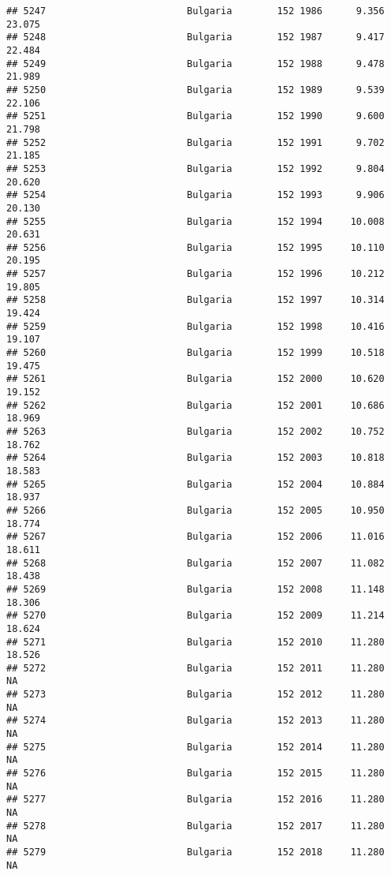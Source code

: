 \documentclass[
]{article}
\begin{document}
\begin{verbatim}
## 5247                         Bulgaria        152 1986      9.356     23.075
## 5248                         Bulgaria        152 1987      9.417     22.484
## 5249                         Bulgaria        152 1988      9.478     21.989
## 5250                         Bulgaria        152 1989      9.539     22.106
## 5251                         Bulgaria        152 1990      9.600     21.798
## 5252                         Bulgaria        152 1991      9.702     21.185
## 5253                         Bulgaria        152 1992      9.804     20.620
## 5254                         Bulgaria        152 1993      9.906     20.130
## 5255                         Bulgaria        152 1994     10.008     20.631
## 5256                         Bulgaria        152 1995     10.110     20.195
## 5257                         Bulgaria        152 1996     10.212     19.805
## 5258                         Bulgaria        152 1997     10.314     19.424
## 5259                         Bulgaria        152 1998     10.416     19.107
## 5260                         Bulgaria        152 1999     10.518     19.475
## 5261                         Bulgaria        152 2000     10.620     19.152
## 5262                         Bulgaria        152 2001     10.686     18.969
## 5263                         Bulgaria        152 2002     10.752     18.762
## 5264                         Bulgaria        152 2003     10.818     18.583
## 5265                         Bulgaria        152 2004     10.884     18.937
## 5266                         Bulgaria        152 2005     10.950     18.774
## 5267                         Bulgaria        152 2006     11.016     18.611
## 5268                         Bulgaria        152 2007     11.082     18.438
## 5269                         Bulgaria        152 2008     11.148     18.306
## 5270                         Bulgaria        152 2009     11.214     18.624
## 5271                         Bulgaria        152 2010     11.280     18.526
## 5272                         Bulgaria        152 2011     11.280         NA
## 5273                         Bulgaria        152 2012     11.280         NA
## 5274                         Bulgaria        152 2013     11.280         NA
## 5275                         Bulgaria        152 2014     11.280         NA
## 5276                         Bulgaria        152 2015     11.280         NA
## 5277                         Bulgaria        152 2016     11.280         NA
## 5278                         Bulgaria        152 2017     11.280         NA
## 5279                         Bulgaria        152 2018     11.280         NA

\end{verbatim}
\end{document}
